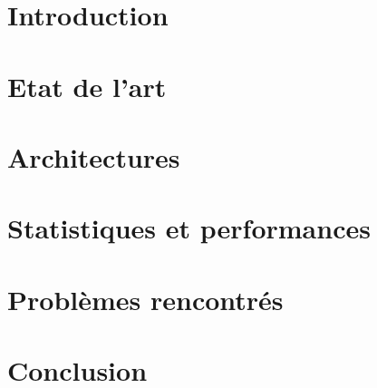 \documentclass[14pt,a4paper,titlepage]{report}
\begin{document}

\renewcommand\headrulewidth{2pt}

\newpage
\pagestyle{empty}
\tableofcontents

\newpage
\chapter{Introduction}
\thispagestyle{fancy}



\chapter{Etat de l'art}
\thispagestyle{fancy}



\chapter{Architectures}
\thispagestyle{fancy}
%


\chapter{Statistiques et performances}
\thispagestyle{fancy}
%


\chapter{Problèmes rencontrés }
\thispagestyle{fancy}
%

\chapter{Conclusion}
\thispagestyle{fancy}
%
\end{document}
